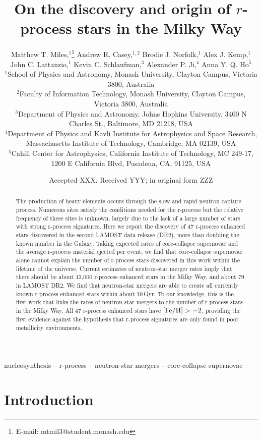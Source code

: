 \documentclass[a4paper,fleqn,usenatbib]{mnras}
\title[Discovery and origin of $r$-process stars]{On the discovery and origin of $r$-process stars in the Milky Way}
\author[Matthew T. Miles et al.]{Matthew T. Miles,$^{1}$\thanks{E-mail: mtmil3@student.monash.edu}
	Andrew R. Casey,$^{1,2}$
	Brodie J. Norfolk,$^{1}$
	Alex J. Kemp,$^{1}$\newauthor
	John C. Lattanzio,$^{1}$
	Kevin C. Schlaufman,$^{3}$
	Alexander P. Ji,$^{4}$
	Anna Y. Q. Ho$^{5}$
	\\
	$^{1}$School of Physics and Astronomy, Monash University, Clayton Campus, Victoria 3800, Australia\\
	$^{2}$Faculty of Information Technology, Monash University, Clayton Campus, Victoria 3800, Australia\\
	$^{3}$Department of Physics and Astronomy, Johns Hopkins University, 3400 N Charles St., Baltimore, MD 21218, USA\\
	$^{4}$Department of Physics and Kavli Institute for Astrophysics and Space Research, Massachusetts Institute of Technology, Cambridge, MA 02139, USA\\
	$^{5}$Cahill Center for Astrophysics, California Institute of Technology, MC 249-17, 1200 E California Blvd, Pasadena, CA, 91125, USA
}
\date{Accepted XXX. Received YYY; in original form ZZZ}
\begin{document}
	\label{firstpage}
	\pagerange{\pageref{firstpage}--\pageref{lastpage}}
	\maketitle
	
	\begin{abstract}
		The production of heavy elements occurs through the slow and rapid neutron capture process. Numerous sites satisfy the conditions needed for the r-process but the relative frequency of these sites is unknown, largely due to the lack of a large number of stars with strong r-process signatures. Here we report the discovery of 47 r-process enhanced stars discovered in the second LAMOST data release (DR2), more than doubling the known number in the Galaxy. Taking expected rates of core-collapse supernovae and the average r-process material ejected per event, we find that core-collapse supernovae alone cannot explain the number of r-process stars discovered in this work within the lifetime of the universe. Current estimates of neutron-star merger rates imply that there should be about 13,000 r-process enhanced stars in the Milky Way, and about $79$ in LAMOST DR2. We find that neutron-star mergers are able to create all currently known r-process enhanced stars within about 10\,Gyr. To our knowledge, this is the first work that links the rates of neutron-star mergers to the number of r-process stars in the Milky Way. All 47 r-process enhanced stars have $[{\rm Fe/H}] > -2$, providing the first evidence against the hypothesis that r-process signatures are only found in poor metallicity environments.
	\end{abstract}
	
	\begin{keywords}
		nucleosynthesis -- r-process -- neutron-star mergers -- core-collapse supernovae
	\end{keywords}
	
	
	\section{Introduction}
	
\end{document}
